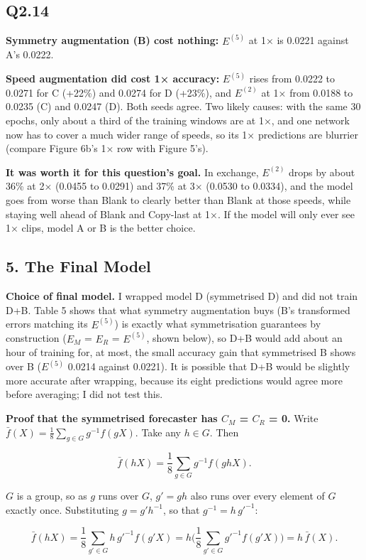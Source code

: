 \documentclass[11pt]{article}
\begin{document}
\subsection*{Q2.14}
\textbf{Symmetry augmentation (B) cost nothing:} \(E^{(5)}\) at 1× is 0.0221 against A's 0.0222.

\textbf{Speed augmentation did cost 1× accuracy:} \(E^{(5)}\) rises from 0.0222 to 0.0271 for C (+22\%) and 0.0274 for D (+23\%), and \(E^{(2)}\) at 1× from 0.0188 to 0.0235 (C) and 0.0247 (D). Both seeds agree. Two likely causes: with the same 30 epochs, only about a third of the training windows are at 1×, and one network now has to cover a much wider range of speeds, so its 1× predictions are blurrier (compare Figure 6b's 1× row with Figure 5's).

\textbf{It was worth it for this question's goal.} In exchange, \(E^{(2)}\) drops by about 36\% at 2× (0.0455 to 0.0291) and 37\% at 3× (0.0530 to 0.0334), and the model goes from worse than Blank to clearly better than Blank at those speeds, while staying well ahead of Blank and Copy-last at 1×. If the model will only ever see 1× clips, model A or B is the better choice.


\newpage
\subsection*{5. The Final Model}
\textbf{Choice of final model.} I wrapped model D (symmetrised D) and did not train D+B. Table 5 shows that what symmetry augmentation buys (B's transformed errors matching its \(E^{(5)}\)) is exactly what symmetrisation guarantees by construction (\(E_M\) = \(E_R\) = \(E^{(5)}\), shown below), so D+B would add about an hour of training for, at most, the small accuracy gain that symmetrised B shows over B (\(E^{(5)}\) 0.0214 against 0.0221). It is possible that D+B would be slightly more accurate after wrapping, because its eight predictions would agree more before averaging; I did not test this.

\textbf{Proof that the symmetrised forecaster has \(C_M\) = \(C_R\) = 0.} Write \(\bar f(X) = \frac18\sum_{g\in G} g^{-1} f(gX)\). Take any \(h \in G\). Then

\[\bar f(hX) = \frac18\sum_{g\in G} g^{-1} f(ghX).\]

\(G\) is a group, so as \(g\) runs over \(G\), \(g' = gh\) also runs over every element of \(G\) exactly once. Substituting \(g = g'h^{-1}\), so that \(g^{-1} = h\,g'^{-1}\):

\[\bar f(hX) = \frac18\sum_{g'\in G} h\,g'^{-1} f(g'X) = h\Big(\frac18\sum_{g'\in G} g'^{-1} f(g'X)\Big) = h\,\bar f(X).\]
\end{document}
